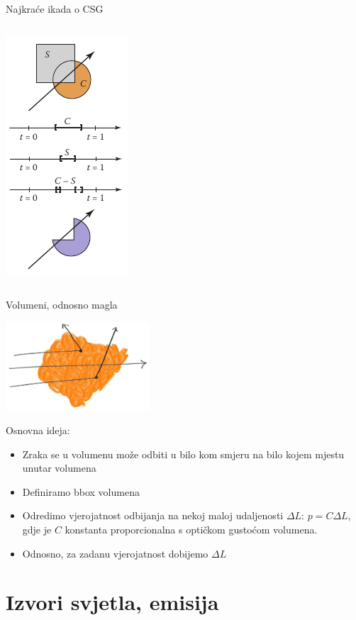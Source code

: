 \documentclass[9pt]{beamer}
\begin{document}
\begin{frame}{Najkraće ikada o CSG}
\begin{columns}
\begin{column}{0.5\textwidth}
		\begin{center}
			\includegraphics[height=0.8\textheight]{slike/csg_02.png}
		\end{center}
	\end{column}
	\end{columns}
\end{frame}

\begin{frame}{Volumeni, odnosno magla}
	\begin{center}
		\includegraphics[width=0.4\textwidth]{slike/fig-2.08-ray-vol.jpg}
	\end{center}
	Osnovna ideja:
	\begin{itemize}
		\item Zraka se u volumenu može odbiti u bilo kom smjeru na bilo kojem mjestu unutar volumena
		\item Definiramo bbox volumena
		\item Odredimo vjerojatnost odbijanja na nekoj maloj udaljenosti $\Delta L$: $p = C\Delta L$, gdje je $C$ konstanta proporcionalna s optičkom gustoćom volumena.
		\item Odnosno, za zadanu vjerojatnost dobijemo $\Delta L$
	\end{itemize}
\end{frame}
\section{Izvori svjetla, emisija}
\end{document}
